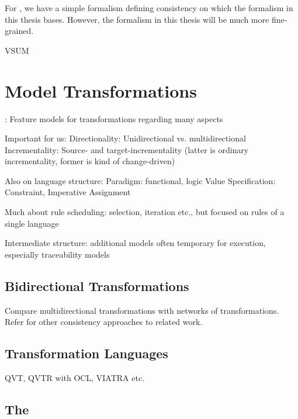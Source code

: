 For \vitruv, we have a simple formalism defining consistency on which the formalism in this thesis bases.
However, the formalism in this thesis will be much more fine-grained.

\gls{VSUM} \vsum


\section{Model Transformations}

\textcite{czarnecki2006a}: Feature models for transformations regarding many aspects

Important for us:
Directionality: Unidirectional vs. multidirectional
Incrementality: Source- and target-incrementality (latter is ordinary incrementality, former is kind of change-driven)

Also on language structure:
Paradigm: functional, logic
Value Specification: Constraint, Imperative Assignment

Much about rule scheduling: selection, iteration etc., but focused on rules of a single language

Intermediate structure: additional models often temporary for execution, especially traceability models


\subsection{Bidirectional Transformations}


Compare multidirectional transformations with networks of transformations.
Refer for other consistency approaches to related work.

\subsection{Transformation Languages}

\gls{QVT}, \gls{QVTR} with \gls{OCL}, \gls{VIATRA} etc.



\subsection{The \reactionslanguage}
\label{chap:foundations:transformations:reactions}

